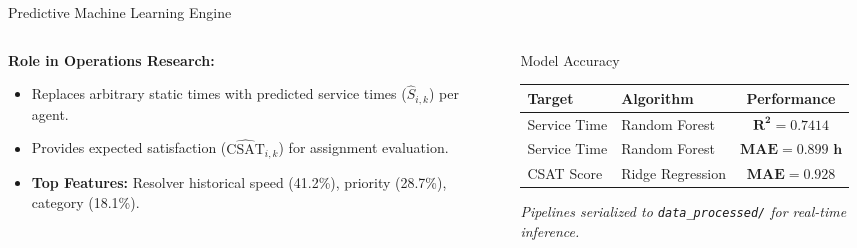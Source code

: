 \documentclass[10pt,aspectratio=169]{beamer}
\begin{document}
\begin{frame}{Predictive Machine Learning Engine}
    \begin{columns}[c]
        \begin{column}{0.50\textwidth}
            \textbf{Role in Operations Research:}
            \vspace{0.2cm}
            \begin{itemize}
                \setlength\itemsep{0.6em}
                \item Replaces arbitrary static times with predicted service times ($\widehat{S}_{i,k}$) per agent.
                \item Provides expected satisfaction ($\widehat{\text{CSAT}}_{i,k}$) for assignment evaluation.
                \item \textbf{Top Features:} Resolver historical speed (41.2\%), priority (28.7\%), category (18.1\%).
            \end{itemize}
        \end{column}
        \begin{column}{0.46\textwidth}
            \begin{block}{Model Accuracy}
                \centering
                \vspace{0.15cm}
                \small
                \begin{tabular}{llc}
                    \toprule
                    \textbf{Target} & \textbf{Algorithm} & \textbf{Performance} \\
                    \midrule
                    Service Time & Random Forest & $\mathbf{R^2 = 0.7414}$ \\
                    Service Time & Random Forest & $\mathbf{MAE = 0.899\text{ h}}$ \\
                    CSAT Score & Ridge Regression & $\mathbf{MAE = 0.928}$ \\
                    \bottomrule
                \end{tabular}
                \vspace{0.15cm}
            \end{block}
            \vspace{0.2cm}
            \centering
            \footnotesize \textit{Pipelines serialized to \texttt{data\_processed/} for real-time inference.}
        \end{column}
    \end{columns}
\end{frame}
\end{document}
